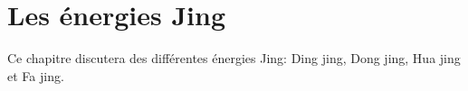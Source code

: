 \chapter{Les énergies Jing}\label{ch:jing}

Ce chapitre discutera des différentes énergies Jing: Ding jing, Dong jing, Hua jing et Fa jing.
